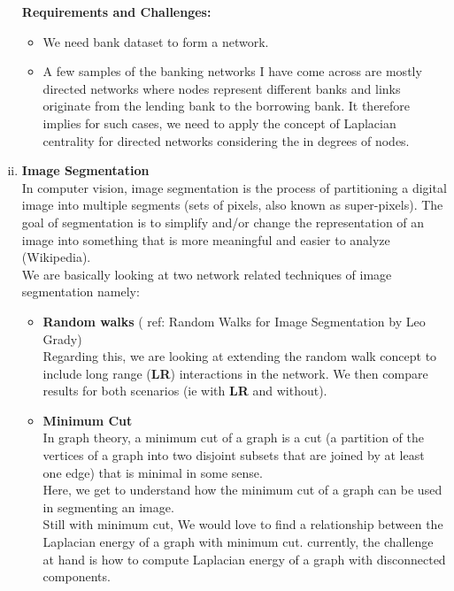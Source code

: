 \documentclass[10pt,a4paper]{article}
\begin{document}
\begin{enumerate}[i)]
\textbf{Requirements and Challenges:}\\
\begin{itemize}
\item We need bank dataset to form a network.\\
\item A few samples of the banking networks I have come across are mostly directed networks where nodes represent different banks and links originate from the lending bank to the borrowing bank. It therefore implies for such cases, we need to apply the concept of Laplacian centrality for directed networks considering the in degrees of nodes. 
\end{itemize}

\item \textbf{Image Segmentation} \\

In computer vision, image segmentation is the process of partitioning a digital image into multiple segments (sets of pixels, also known as super-pixels). The goal of segmentation is to simplify and/or change the representation of an image into something that is more meaningful and easier to analyze (Wikipedia).\\

We are basically looking at two network related techniques of image segmentation namely:\\
\begin{itemize}
\item \textbf{Random walks} ( ref: Random Walks for Image Segmentation by Leo Grady)\\

Regarding this, we are looking at extending the random walk concept to include long range (\textbf{LR}) interactions in the network. We then compare results for both scenarios (ie with \textbf{LR} and without).\\

\item \textbf{Minimum Cut} \\
In graph theory, a minimum cut of a graph is a cut (a partition of the vertices of a graph into two disjoint subsets that are joined by at least one edge) that is minimal in some sense.\\

Here, we get to understand how the minimum cut of a graph can be used in segmenting an image. \\

Still with minimum cut, We would love to find a relationship between the Laplacian energy of a graph with minimum cut. currently, the challenge at hand is 
how to compute Laplacian energy of a graph with disconnected components.
\end{itemize}


\end{enumerate}
\end{document}
